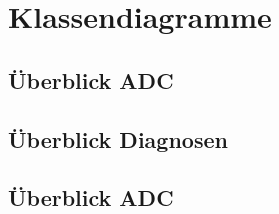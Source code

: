 \section{Klassendiagramme}
\label{sec:class diagramms}

\subsection{Überblick ADC}
\label{subsec:overview-adc}

\subsection{Überblick Diagnosen}
\label{subsec:overview-adc}

\subsection{Überblick ADC}
\label{subsec:overview-adc}